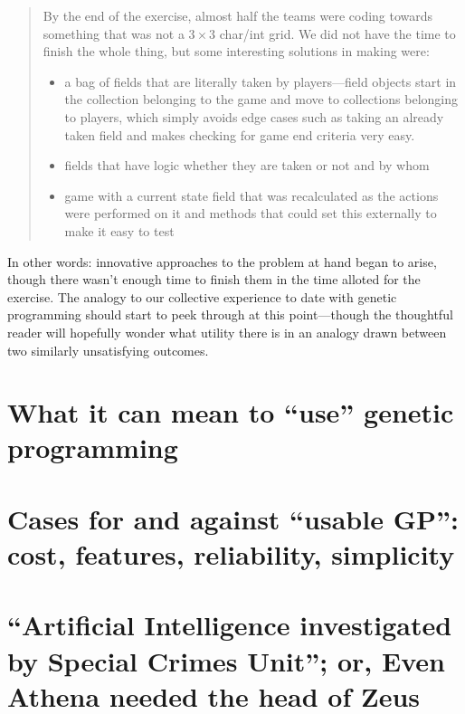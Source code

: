 \begin{quotation}
By the end of the exercise, almost half the teams were coding towards something that was not a $3\times 3$ char/int grid. We did not have the time to finish the whole thing, but some interesting solutions in making were:

\begin{itemize}
\item a bag of fields that are literally taken by players---field objects start in the collection belonging to the game and move to collections belonging to players, which simply avoids edge cases such as taking an already taken field and makes checking for game end criteria very easy.
\item fields that have logic whether they are taken or not and by whom
\item game with a current state field that was recalculated as the actions were performed on it and methods that could set this externally to make it easy to test
\end{itemize}
\end{quotation}

In other words: innovative approaches to the problem at hand began to arise, though there wasn't enough time to finish them in the time alloted for the exercise. The analogy to our collective experience to date with genetic programming should start to peek through at this point---though the thoughtful reader will hopefully wonder what utility there is in an analogy drawn between two similarly unsatisfying outcomes.

\section{What it can mean to ``use'' genetic programming}\hypertarget{what-it-can-mean-to-use-genetic-programming}{}\label{what-it-can-mean-to-use-genetic-programming}

\section{Cases for and against ``usable GP'': cost, features, reliability, simplicity}\hypertarget{cases-for-and-against-usable-gp-cost-features-reliability-simplicity}{}\label{cases-for-and-against-usable-gp-cost-features-reliability-simplicity}

\section{``Artificial Intelligence investigated by Special Crimes Unit''; or, Even Athena needed the head of Zeus}\hypertarget{artificial-intelligence-investigated-by-special-crimes-unit-or-even-athena-needed-the-head-of-zeus}{}\label{artificial-intelligence-investigated-by-special-crimes-unit-or-even-athena-needed-the-head-of-zeus}

